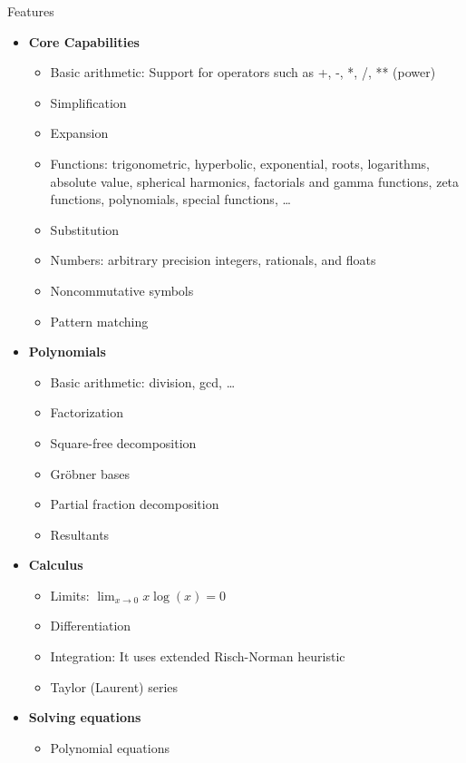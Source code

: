 \documentclass[aspectratio=169,xcolor=svgnames]{beamer}
\begin{document}
\begin{frame}{Features}
  \begin{multicols}{2}
    \tiny
    \begin{itemize}
    \item \textbf{Core Capabilities}
      \begin{itemize}
        \tiny
      \item Basic arithmetic: Support for operators such as +, -, *, /, ** (power)
      \item Simplification
      \item Expansion
      \item Functions: trigonometric, hyperbolic, exponential, roots, logarithms,
        absolute value, spherical harmonics, factorials and gamma functions, zeta
        functions, polynomials, special functions, \ldots
      \item Substitution
      \item Numbers: arbitrary precision integers, rationals, and floats
      \item Noncommutative symbols
      \item Pattern matching
      \end{itemize}
    \item \textbf{Polynomials}
      \begin{itemize}
        \tiny
      \item Basic arithmetic: division, gcd, \ldots
      \item Factorization
      \item Square-free decomposition
      \item Gröbner bases
      \item Partial fraction decomposition
      \item Resultants
      \end{itemize}
    \item \textbf{Calculus}
      \begin{itemize}
        \tiny
      \item Limits: $\lim_{x\to 0}{x\log(x)} = 0$
      \item Differentiation
      \item Integration: It uses extended Risch-Norman heuristic
      \item Taylor (Laurent) series
      \end{itemize}
    \item \textbf{Solving equations}
      \begin{itemize}
        \tiny
      \item Polynomial equations

\end{itemize}
\end{itemize}
\end{multicols}
\end{frame}
\end{document}
